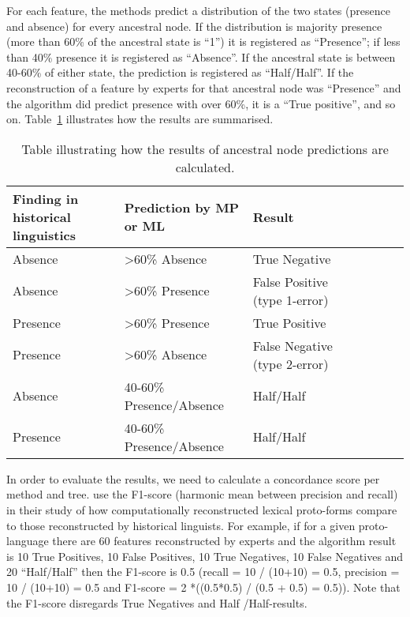 \documentclass[a4paper,10pt]{article} %
\begin{document}
For each feature, the methods predict a distribution of the two states (presence and absence) for every ancestral node. If the distribution is majority presence (more than 60\% of the ancestral state is ``1'') it is registered as ``Presence''; if less than 40\% presence it is registered as ``Absence''. If the ancestral state is between 40-60\% of either state, the prediction is registered as ``Half/Half''. If the reconstruction of a feature by experts for that ancestral node was ``Presence'' and the algorithm did predict presence with over 60\%, it is a ``True positive'', and so on. Table~\ref{example_HL_prediction_table_true_positives} illustrates how the results are summarised.

\begin{table}[H]
\centering
\caption{Table illustrating how the results of ancestral node predictions are calculated.}
\label{example_HL_prediction_table_true_positives}
\begin{tabular}{|l|l|l|l|l|l|l|l|}
\hline
\textbf{Finding in historical linguistics} & \textbf{Prediction by MP or ML} & \textbf{Result} \\ \hline
Absence & >60\% Absence & True Negative \\ \hline
Absence & >60\% Presence & False Positive (type 1-error) \\ \hline
Presence & >60\% Presence & True Positive \\ \hline
Presence & >60\% Absence & False Negative (type 2-error) \\ \hline
Absence & 40-60\% Presence/Absence & Half/Half \\ \hline
Presence & 40-60\% Presence/Absence & Half/Half\\ \hline
\end{tabular}
\end{table}

In order to evaluate the results, we need to calculate a concordance score per method and tree. \citet{jager2018using} use the F1-score (harmonic mean between precision and recall) in their study of how computationally reconstructed lexical proto-forms compare to those reconstructed by historical linguists.  For example, if for a given proto-language there are 60 features reconstructed by experts and the algorithm result is 10 True Positives, 10 False Positives, 10 True Negatives, 10 False Negatives and 20 ``Half/Half'' then the F1-score is 0.5 (recall = 10 / (10+10) = 0.5, precision = 10 / (10+10) = 0.5 and F1-score = 2 *((0.5*0.5) / (0.5 + 0.5) = 0.5)). Note that the F1-score disregards True Negatives and Half /Half-results.
\end{document}
